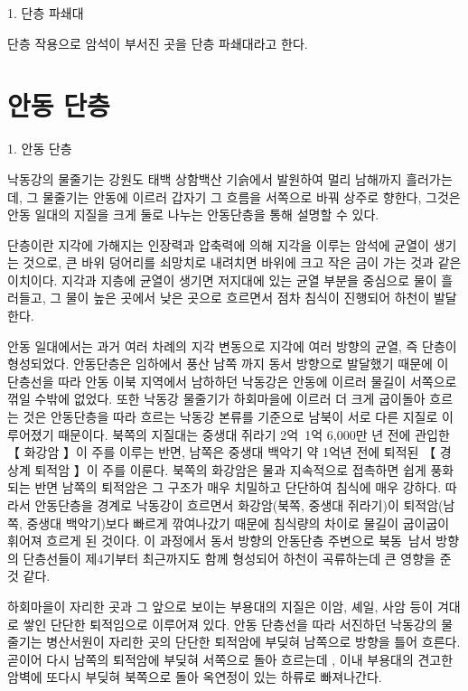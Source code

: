 \documentclass[12pt, a4paper, oneside]{book}
\begin{document}
1. 		단층 파쇄대


단층 작용으로 암석이 부서진 곳을 단층 파쇄대라고 한다.




	\newpage  \null
	\section{안동 단층}




1. 		안동 단층

낙동강의 물줄기는 강원도 태백 상함백산 기슭에서 발원하여 멀리 남해까지 흘러가는데, 그 물줄기는 안동에 이르러 갑자기 그 흐름을 서쪽으로 바꿔 상주로 향한다, 그것은 안동 일대의 지질을 크게 둘로 나누는 안동단층을 통해 설명할 수 있다.

단층이란 지각에 가해지는 인장력과 압축력에 의해 지각을 이루는 암석에 균열이 생기는 것으로, 큰 바위 덩어리를 쇠망치로 내려치면 바위에 크고 작은 금이 가는 것과 같은 이치이다. 지각과 지층에 균열이 생기면 저지대에 있는 균열 부분을 중심으로 물이 흘러들고, 그 물이 높은 곳에서 낮은 곳으로 흐르면서 점차 침식이 진행되어 하천이 발달한다.

안동 일대에서는 과거 여러 차례의 지각 변동으로 지각에 여러 방향의 균열, 즉 단층이 형성되었다. 안동단층은 임하에서 풍산 남쪽 까지 동서 방향으로 발달했기 때문에 이 단층선을 따라 안동 이북 지역에서 남하하던 낙동강은 안동에 이르러 물길이 서쪽으로 꺾일 수밖에 없었다. 또한 낙동강 물줄기가 하회마을에 이르러 더 크게 굽이돌아 흐르는 것은 안동단층을 따라 흐르는 낙동강 본류를 기준으로 남북이 서로 다른 지질로 이루어졌기 때문이다. 북쪽의 지질대는 중생대 쥐라기 2억~1억 6,000만 년 전에 관입한 【 화강암 】이 주를 이루는 반면, 남쪽은 중생대 백악기 약 1억년 전에 퇴적된 【 경상계 퇴적암 】이 주를 이룬다. 북쪽의 화강암은 물과 지속적으로 접촉하면 쉽게 풍화되는 반면 남쪽의 퇴적암은 그 구조가 매우 치밀하고 단단하여 침식에 매우 강하다. 따라서 안동단층을 경계로 낙동강이 흐르면서 화강암(북쪽, 중생대 쥐라기)이 퇴적암(남쪽, 중생대 백악기)보다 빠르게 깎여나갔기 때문에 침식량의 차이로 물길이 굽이굽이 휘어져 흐르게 된 것이다. 이 과정에서 동서 방향의 안동단층 주변으로 북동~남서 방향의 단층선들이 제4기부터 최근까지도 함께 형성되어 하천이 곡류하는데 큰 영향을 준 것 같다.

하회마을이 자리한 곳과 그 앞으로 보이는 부용대의 지질은 이암, 셰일, 사암 등이 겨대로 쌓인 단단한 퇴적임으로 이루어져 있다. 안동 단층선을 따라 서진하던 낙동강의 물줄기는 병산서원이 자리한 곳의 단단한 퇴적암에 부딪혀 남쪽으로 방향을 틀어 흐른다. 곧이어 다시 남쪽의 퇴적암에 부딪혀 서쪽으로 돌아 흐르는데 , 이내 부용대의 견고한 암벽에 또다시 부딪혀 북쪽으로 돌아 옥연정이 있는 하류로 빠져나간다.
\end{document}
